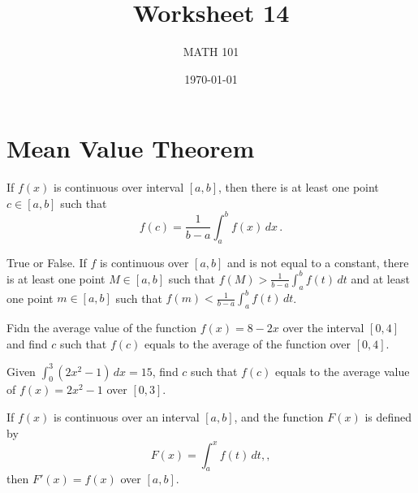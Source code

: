 \documentclass[12pt]{amsart}
\title{ Worksheet 14}
\author{MATH 101}
\date{\today}
\begin{document}
\maketitle


\section*{Mean Value Theorem}

\begin{theorem}
	If $f(x)$ is continuous over interval $[a,b]$, then there is at least one point $c \in [a,b]$
	such that
	\begin{equation*}
		f(c) = \frac{1}{b-a} \int_a^b f(x) \, dx  \,.
	\end{equation*}
\end{theorem}


\begin{problem}
True or False.
If $f$ is continuous over $[a,b]$ and is not equal to a constant,
there is at least one point $M \in [a,b]$ such that
$f(M) > \frac{1}{b-a} \int_a^b f(t) \, dt $
and at least one point $m\in [a,b]$ such that
$f(m) < \frac{1}{b-a} \int_a^b f(t) \, dt$.
\end{problem}
\vspace{11cm}

\begin{problem}
Fidn the average value of the function $f(x) = 8 - 2x$ over
the interval $[0,4]$ and find $c$
such that $f(c)$ equals to the average of the function over $[0,4]$.
\end{problem}
\vspace{7cm}

\begin{problem}
Given $\int_0^3 (2x^2 -1) \, dx = 15$, find $c$ such that $f(c)$ equals to the average
value of $f(x) = 2x^2 -1$ over $[0,3]$.
\end{problem}
\vspace{7cm}


\begin{theorem}
	If $f(x)$ is continuous over an interval $[a,b]$, and the function
	$F(x)$ is defined by
	\begin{equation*}
		F(x) = \int_a^x f(t) \, dt ,,
	\end{equation*}
	then $F'(x) = f(x)$ over $[a,b]$.
\end{theorem}
\end{document}
